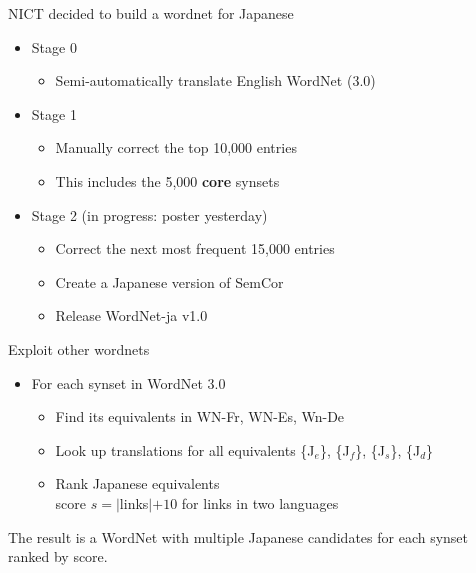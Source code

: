 \documentclass{beamer}
\begin{document}
\begin{frame}{NICT decided to build a wordnet for Japanese}
\begin{itemize}
\item Stage 0
  \begin{itemize}
  \item Semi-automatically translate English WordNet (3.0)
  \end{itemize}
\item Stage 1 
  \begin{itemize}
  \item Manually correct the top 10,000 entries
  \item This includes the 5,000 \textbf{core} synsets
  \end{itemize}
\item Stage 2 (in progress: poster yesterday)
  \begin{itemize}
  \item Correct the next most frequent 15,000 entries
  \item Create a Japanese version of SemCor
\item Release WordNet-ja v1.0
\end{itemize}
\end{itemize}

\end{frame}

\begin{frame}{Exploit other wordnets}

\begin{itemize}
\item For each synset in WordNet 3.0
  \begin{itemize}
  \item Find its equivalents in WN-Fr, WN-Es, Wn-De
  \item Look up translations for all equivalents
    \{J$_e$\}, \{J$_f$\}, \{J$_s$\}, \{J$_d$\}
  \item Rank Japanese equivalents
    \\ score $s = |$links$| + 10$ for links in two languages   
  \end{itemize}
\end{itemize}

The result is a WordNet with  multiple Japanese candidates for each
synset ranked by score.
\end{frame}
\end{document}
